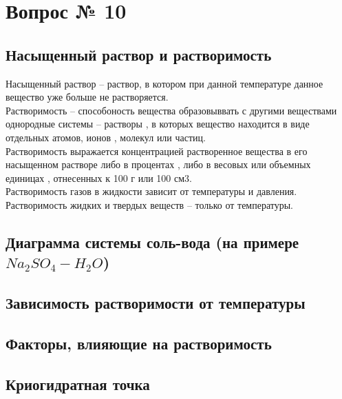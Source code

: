 \documentclass[14pt,a4paper]{scrartcl}
\begin{document}
	\section*{Вопрос № 10}
	\subsection*{Насыщенный раствор и растворимость}
	Насыщенный раствор – раствор, в котором при данной температуре данное вещество уже больше не растворяется.\\
	Растворимость – способоность вещества образовыввать с другими веществами однородные системы – растворы , в которых вещество находится в виде отдельных атомов, ионов , молекул или частиц. \\
	Растворимость выражается концентрацией растворенное вещества в его насыщенном растворе либо в процентах , либо в весовых или объемных единицах , отнесенных к 100 г или 100 см3.\\
	Растворимость газов в жидкости зависит от температуры и давления. Растворимость жидких и твердых веществ – только от температуры.
	\subsection*{Диаграмма системы соль-вода (на примере $Na_2SO_4 - H_2O$)}
	\subsection*{Зависимость растворимости от температуры}
	\subsection*{Факторы, влияющие на растворимость}
	\subsection*{Криогидратная точка}
	
\end{document}
